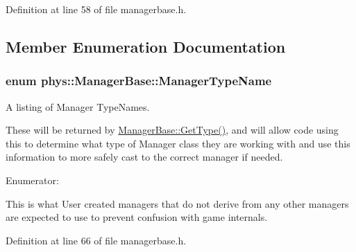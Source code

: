 Definition at line 58 of file managerbase.h.



\subsection{Member Enumeration Documentation}
\hypertarget{classphys_1_1ManagerBase_aaa6ccddf23892eaccb898529414f80a5}{
\subsubsection[{ManagerTypeName}]{\setlength{\rightskip}{0pt plus 5cm}enum {\bf phys::ManagerBase::ManagerTypeName}}}
\label{d2/de3/classphys_1_1ManagerBase_aaa6ccddf23892eaccb898529414f80a5}


A listing of Manager TypeNames. 

These will be returned by \hyperlink{classphys_1_1ManagerBase_aff400b6599db635e24796d8221e9a0e3}{ManagerBase::GetType()}, and will allow code using this to determine what type of Manager class they are working with and use this information to more safely cast to the correct manager if needed. \begin{Desc}
\item[Enumerator: ]\par
\begin{description}
\item[{\em 
\hypertarget{classphys_1_1ManagerBase_aaa6ccddf23892eaccb898529414f80a5a3239296e554feede76c4bcb6f824c66c}{
UserCreated}
\label{d2/de3/classphys_1_1ManagerBase_aaa6ccddf23892eaccb898529414f80a5a3239296e554feede76c4bcb6f824c66c}
}]This is what User created managers that do not derive from any other managers are expected to use to prevent confusion with game internals. \end{description}
\end{Desc}



Definition at line 66 of file managerbase.h.



